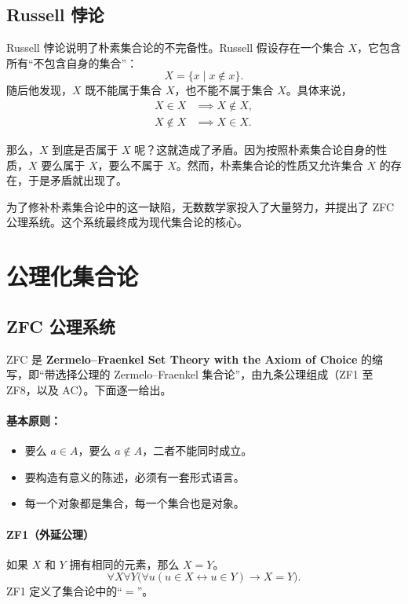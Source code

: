 \subsection*{Russell 悖论}

Russell 悖论说明了朴素集合论的不完备性。Russell 假设存在一个集合 $X$，它包含所有“不包含自身的集合”：
\[
X=\{x\mid x\notin x\}.
\]
随后他发现，$X$ 既不能属于集合 $X$，也不能不属于集合 $X$。具体来说，
\begin{align*}
    X\in X &\implies X\notin X,\\
    X\notin X &\implies X\in X.
\end{align*}

那么，$X$ 到底是否属于 $X$ 呢？这就造成了矛盾。因为按照朴素集合论自身的性质，$X$ 要么属于 $X$，要么不属于 $X$。然而，朴素集合论的性质又允许集合 $X$ 的存在，于是矛盾就出现了。

为了修补朴素集合论中的这一缺陷，无数数学家投入了大量努力，并提出了 ZFC 公理系统。这个系统最终成为现代集合论的核心。

\section{公理化集合论}

\subsection{ZFC 公理系统}

ZFC 是 \textbf{Zermelo--Fraenkel Set Theory with the Axiom of Choice} 的缩写，即“带选择公理的 Zermelo--Fraenkel 集合论”，由九条公理组成（ZF1 至 ZF8，以及 AC）。下面逐一给出。

\paragraph{基本原则：}
\begin{itemize}
    \item 要么 $a\in A$，要么 $a\notin A$，二者不能同时成立。
    \item 要构造有意义的陈述，必须有一套形式语言。
    \item 每一个对象都是集合，每一个集合也是对象。
\end{itemize}

\paragraph{ZF1（外延公理）}
如果 $X$ 和 $Y$ 拥有相同的元素，那么 $X=Y$。
\[
\forall X\forall Y\bigl(\forall u(u\in X\leftrightarrow u\in Y)\to X=Y\bigr).
\]
ZF1 定义了集合论中的“$=$”。

